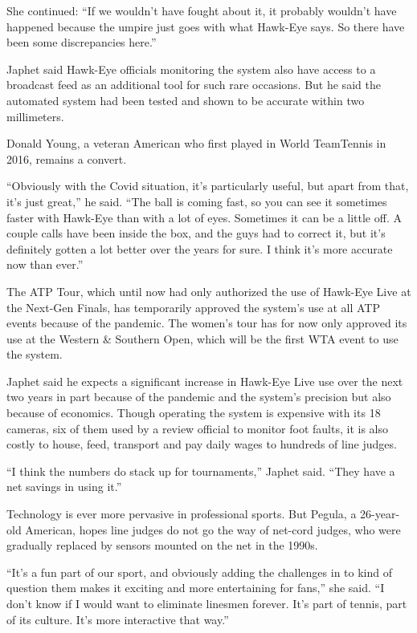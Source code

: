 She continued: ``If we wouldn't have fought about it, it probably
wouldn't have happened because the umpire just goes with what Hawk-Eye
says. So there have been some discrepancies here.''

Japhet said Hawk-Eye officials monitoring the system also have access to
a broadcast feed as an additional tool for such rare occasions. But he
said the automated system had been tested and shown to be accurate
within two millimeters.

Donald Young, a veteran American who first played in World TeamTennis in
2016, remains a convert.

``Obviously with the Covid situation, it's particularly useful, but
apart from that, it's just great,'' he said. ``The ball is coming fast,
so you can see it sometimes faster with Hawk-Eye than with a lot of
eyes. Sometimes it can be a little off. A couple calls have been inside
the box, and the guys had to correct it, but it's definitely gotten a
lot better over the years for sure. I think it's more accurate now than
ever.''

The ATP Tour, which until now had only authorized the use of Hawk-Eye
Live at the Next-Gen Finals, has temporarily approved the system's use
at all ATP events because of the pandemic. The women's tour has for now
only approved its use at the Western \& Southern Open, which will be the
first WTA event to use the system.

Japhet said he expects a significant increase in Hawk-Eye Live use over
the next two years in part because of the pandemic and the system's
precision but also because of economics. Though operating the system is
expensive with its 18 cameras, six of them used by a review official to
monitor foot faults, it is also costly to house, feed, transport and pay
daily wages to hundreds of line judges.

``I think the numbers do stack up for tournaments,'' Japhet said. ``They
have a net savings in using it.''

Technology is ever more pervasive in professional sports. But Pegula, a
26-year-old American, hopes line judges do not go the way of net-cord
judges, who were gradually replaced by sensors mounted on the net in the
1990s.

``It's a fun part of our sport, and obviously adding the challenges in
to kind of question them makes it exciting and more entertaining for
fans,'' she said. ``I don't know if I would want to eliminate linesmen
forever. It's part of tennis, part of its culture. It's more interactive
that way.''

